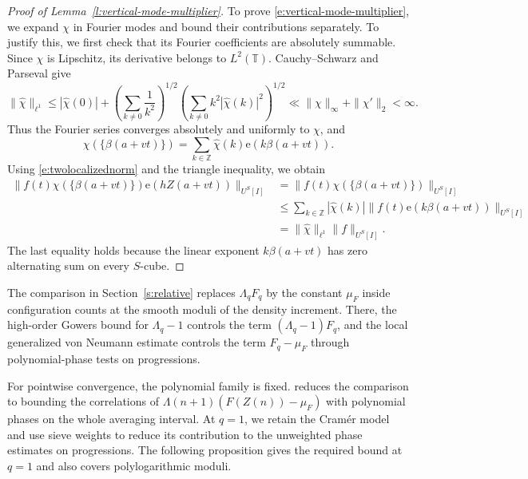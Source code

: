 \documentclass[12pt]{amsart}
\newcommand{\1}{\mathbf 1}
\newcommand{\e}{\mathrm e}
\theoremstyle{definition}
\begin{document}
\begin{proof}[Proof of Lemma~\ref{l:vertical-mode-multiplier}]
To prove \eqref{e:vertical-mode-multiplier}, we expand \(\chi\)
in Fourier modes and bound their contributions separately. To
justify this, we first check that its Fourier coefficients are
absolutely summable. Since \(\chi\) is Lipschitz, its derivative
belongs to \(L^2(\mathbb T)\). Cauchy--Schwarz and Parseval give
\[
 \|\widehat\chi\|_{\ell^1}
 \leq |\widehat\chi(0)|
 +\left(\sum_{k\ne0}\frac1{k^2}\right)^{1/2}
  \left(\sum_{k\ne0}k^2|\widehat\chi(k)|^2\right)^{1/2}
 \ll \|\chi\|_\infty+\|\chi'\|_2<\infty.
\]
Thus the Fourier series converges absolutely and uniformly to
\(\chi\), and
\[
 \chi(\{\beta(a+vt)\})
 =\sum_{k\in\mathbb Z}\widehat\chi(k)\e(k\beta(a+vt)).
\]
Using \eqref{e:twolocalizednorm} and the triangle inequality, we obtain
\[
\begin{aligned}
 \|f(t)\chi(\{\beta(a+vt)\})\e(hZ(a+vt))\|_{U^S[I]}
 &=\|f(t)\chi(\{\beta(a+vt)\})\|_{U^S[I]}\\
 &\leq\sum_{k\in\mathbb Z}|\widehat\chi(k)|
       \|f(t)\e(k\beta(a+vt))\|_{U^S[I]}\\
 &=\|\widehat\chi\|_{\ell^1}\|f\|_{U^S[I]}.
\end{aligned}
\]
The last equality holds because the linear exponent
\(k\beta(a+vt)\) has zero alternating sum on every \(S\)-cube.
\end{proof}


The comparison in Section~\ref{s:relative} replaces
$\Lambda_qF_q$ by the constant $\mu_F$ inside configuration counts
at the smooth moduli of the density increment. There, the high-order
Gowers bound for $\Lambda_q-1$ controls the term $(\Lambda_q-1)F_q$,
and the local generalized von Neumann estimate controls the term
$F_q-\mu_F$ through polynomial-phase tests on progressions.

For pointwise convergence, the polynomial family is fixed.
\cite[Theorem~4.1]{Teravainen} reduces the comparison to bounding
the correlations of $\Lambda(n+1)(F(Z(n))-\mu_F)$ with polynomial
phases on the whole averaging interval. At $q=1$, we retain the
Cram\'er model and use sieve weights to reduce its contribution to
the unweighted phase estimates on progressions. The following
proposition gives the required bound at $q=1$ and also covers
polylogarithmic moduli.
\end{document}
